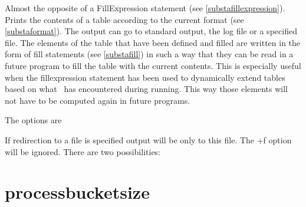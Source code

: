 \noindent Almost the opposite of a 
FillExpression statement (see 
\ref{substafillexpression}). Prints the contents of a 
table according to the current format (see 
\ref{substaformat}). The output can go to standard output, the 
log file or a specified file. The elements of 
the table that have been defined and filled are written in the form of 
fill statements (see \ref{substafill}) in such a way that they 
can be read in a future program to fill the table with the current 
contents. This is especially useful when the fillexpression statement has 
been used to dynamically extend tables based on what \FORM\ has encountered 
during running. This way those elements will not have to be computed again 
in future programs. 

\noindent The options are





\noindent If redirection to a file is specified output will be only to this 
file. The +f option will be ignored. There are two possibilities:


\vspace{10mm}


\section{processbucketsize}
\label{substaprocessbucketsize}

